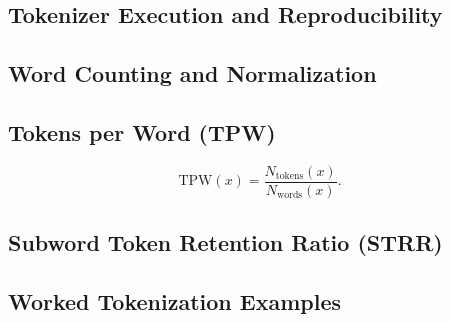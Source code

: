 \documentclass[runningheads]{llncs}
\begin{document}
\subsection{Tokenizer Execution and Reproducibility}

\subsection{Word Counting and Normalization}

\subsection{Tokens per Word (TPW)}
\begin{equation}
  \mathrm{TPW}(x) =
  \frac{N_{\mathrm{tokens}}(x)}
       {N_{\mathrm{words}}(x)}.
  \label{eq:tpw}
\end{equation}

\subsection{Subword Token Retention Ratio (STRR)}

\subsection{Worked Tokenization Examples}
\end{document}
